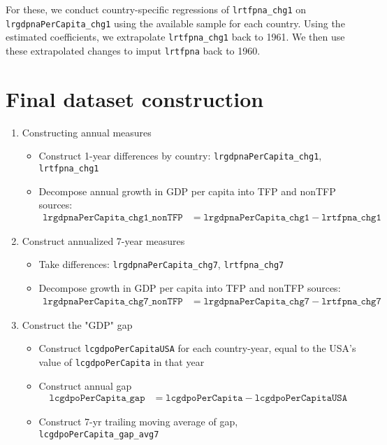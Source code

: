 \documentclass[12pt,english]{article}
\theoremstyle{remark}
\begin{document}
For these, we conduct country-specific regressions of \texttt{lrtfpna\_chg1} on \texttt{lrgdpnaPerCapita\_chg1} using the available sample for each country. Using the estimated coefficients, we extrapolate \texttt{lrtfpna\_chg1} back to 1961. We then use these extrapolated changes to imput \texttt{lrtfpna} back to 1960. 

\section{Final dataset construction}

\begin{enumerate}
	\item Constructing annual measures
	\begin{itemize}
		\item Construct 1-year differences by country: \texttt{lrgdpnaPerCapita\_chg1}, \texttt{lrtfpna\_chg1} 
		\item Decompose annual growth in GDP per capita into TFP and nonTFP sources:
		\begin{align*}
		\texttt{lrgdpnaPerCapita\_chg1\_nonTFP} &= \texttt{lrgdpnaPerCapita\_chg1} - \texttt{lrtfpna\_chg1}
		\end{align*}
	\end{itemize}	
	\item Construct annualized 7-year measures
	\begin{itemize}
		\item Take differences: \texttt{lrgdpnaPerCapita\_chg7}, \texttt{lrtfpna\_chg7}
		\item Decompose growth in GDP per capita into TFP and nonTFP sources:
		\begin{align*}
		\texttt{lrgdpnaPerCapita\_chg7\_nonTFP} &= \texttt{lrgdpnaPerCapita\_chg7} - \texttt{lrtfpna\_chg7}
		\end{align*}
	\end{itemize}  
	\item Construct the "GDP" gap  
	\begin{itemize}
		\item Construct \texttt{lcgdpoPerCapitaUSA} for each country-year, equal to the USA's value of \texttt{lcgdpoPerCapita} in that year
		\item Construct annual gap		
		\begin{align*}
		\texttt{lcgdpoPerCapita\_gap} &= \texttt{lcgdpoPerCapita} - \texttt{lcgdpoPerCapitaUSA}
		\end{align*}
		\item Construct 7-yr trailing moving average of gap, \texttt{lcgdpoPerCapita\_gap\_avg7}

\end{itemize}
\end{enumerate}
\end{document}
